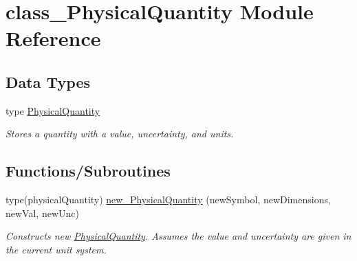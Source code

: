 \hypertarget{namespaceclass__PhysicalQuantity}{
\section{class\_\-PhysicalQuantity Module Reference}
\label{namespaceclass__PhysicalQuantity}
}
\subsection*{Data Types}
\begin{DoxyCompactItemize}
\item 
type \hyperlink{typeclass__PhysicalQuantity_1_1PhysicalQuantity}{PhysicalQuantity}
\begin{DoxyCompactList}\small\item\em Stores a quantity with a value, uncertainty, and units. \item\end{DoxyCompactList}\end{DoxyCompactItemize}
\subsection*{Functions/Subroutines}
\begin{DoxyCompactItemize}
\item 
type(physicalQuantity) \hyperlink{namespaceclass__PhysicalQuantity_a31d0e7291e89fca5b49f9484556cf0cb}{new\_\-PhysicalQuantity} (newSymbol, newDimensions, newVal, newUnc)
\begin{DoxyCompactList}\small\item\em Constructs new \hyperlink{typeclass__PhysicalQuantity_1_1PhysicalQuantity}{PhysicalQuantity}. Assumes the value and uncertainty are given in the current unit system. \item\end{DoxyCompactList}\end{DoxyCompactItemize}
